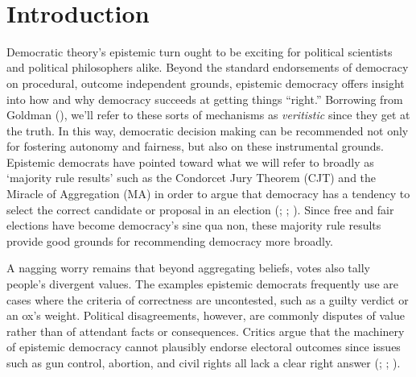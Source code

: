 \documentclass[11pt]{article}
\begin{document}
\ \\
\section{Introduction}
Democratic theory's epistemic turn ought to be exciting for political scientists and political philosophers alike. Beyond the standard endorsements of democracy on procedural, outcome independent grounds, epistemic democracy offers insight into how and why democracy succeeds at getting things ``right.'' Borrowing from Goldman (\cite{Goldman99}), we'll refer to these sorts of mechanisms as \emph{veritistic} since they get at the truth. In this way, democratic decision making can be recommended not only for fostering autonomy and fairness, but also on these instrumental grounds. Epistemic democrats have pointed toward what we will refer to broadly as `majority rule results' such as the Condorcet Jury Theorem (CJT) and the Miracle of Aggregation (MA) in order to argue that democracy has a tendency to select the correct candidate or proposal in an election (\citet{Landemore13}; \cite{Surowiecki2004}; \cite{List2001}). Since free and fair elections have become democracy's sine qua non, these majority rule results provide good grounds for recommending democracy more broadly.


A nagging worry remains that beyond aggregating beliefs, votes also tally people's divergent values. The examples epistemic democrats frequently use are cases where the criteria of correctness are uncontested, such as a guilty verdict or an ox's weight. Political disagreements, however, are commonly  disputes of value rather than of attendant facts or consequences. Critics argue that the machinery of epistemic democracy cannot plausibly endorse electoral outcomes since issues such as gun control, abortion, and civil rights all lack a clear right answer (\citet{Anderson2006}; \citet{Ingham2013}; \cite{urbinati2014democracy}).
\end{document}
